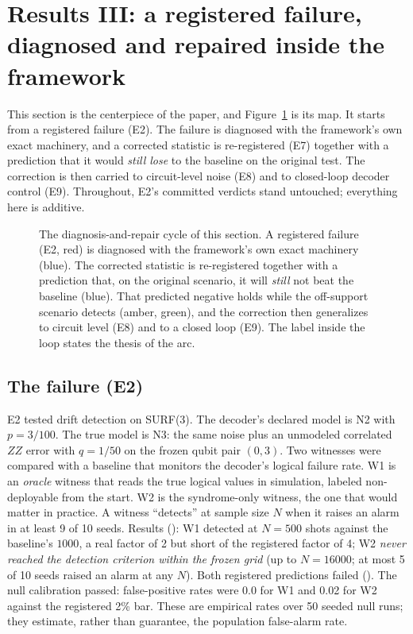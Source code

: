 \section{Results III: a registered failure, diagnosed and repaired inside the framework}
\label{sec:arc}

This section is the centerpiece of the paper, and Figure~\ref{fig:cycle} is its map. It starts from a registered failure (E2). The failure is diagnosed with the framework's own exact machinery, and a corrected statistic is re-registered (E7) together with a prediction that it would \emph{still lose} to the baseline on the original test. The correction is then carried to circuit-level noise (E8) and to closed-loop decoder control (E9). Throughout, E2's committed verdicts stand untouched; everything here is additive.

\begin{figure}[htbp]
\centering

\caption{The diagnosis-and-repair cycle of this section. A registered failure (E2, red) is diagnosed with the framework's own exact machinery (blue). The corrected statistic is re-registered together with a prediction that, on the original scenario, it will \emph{still} not beat the baseline (blue). That predicted negative holds while the off-support scenario detects (amber, green), and the correction then generalizes to circuit level (E8) and to a closed loop (E9). The label inside the loop states the thesis of the arc.}%
\label{fig:cycle}
\end{figure}

\subsection{The failure (E2)}
\label{sec:e2}

E2 tested drift detection on SURF(3). The decoder's declared model is N2 with $p = 3/100$. The true model is N3: the same noise plus an unmodeled correlated $ZZ$ error with $q = 1/50$ on the frozen qubit pair $(0,3)$. Two witnesses were compared with a baseline that monitors the decoder's logical failure rate. W1 is an \emph{oracle} witness that reads the true logical values in simulation, labeled non-deployable from the start. W2 is the syndrome-only witness, the one that would matter in practice. A witness ``detects'' at sample size $N$ when it raises an alarm in at least 9 of 10 seeds. Results (\gMeasured): W1 detected at $N = 500$ shots against the baseline's $1000$, a real factor of 2 but short of the registered factor of 4; W2 \emph{never reached the detection criterion within the frozen grid} (up to $N = 16000$; at most 5 of 10 seeds raised an alarm at any $N$). Both registered predictions failed (\gRegNeg). %
The null calibration passed: false-positive rates were 0.0 for W1 and 0.02 for W2 against the registered 2\% bar. These are empirical rates over 50 seeded null runs; they estimate, rather than guarantee, the population false-alarm rate. %

